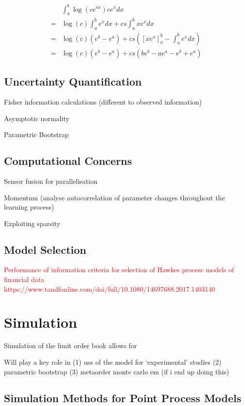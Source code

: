 \documentclass[honours,12pt]{unswthesis}
\numberwithin{equation}{section}
\begin{document}
\begin{equation*}
	\begin{align}
		& \int_a^b \log(c e^{sx}) c e^x dx \\
		= & \log(c) \int_a^b e^x dx + cs\int_a^b x e^x dx \\
		= & \log(c)(e^b-e^a) + cs \left(\left[x e^x\right]_a^b - \int_a^b e^x dx\right) \\
		= & \log(c)(e^b-e^a) + cs \left(be^b - a e^a - e^b + e^a\right)
	\end{align}
\end{equation*}


\section{Uncertainty Quantification}
Fisher information calculations (different to observed information)

Asymptotic normality

Parametric Bootstrap

\section{Computational Concerns}
Sensor fusion for parallelisation

Momentum (analyse autocorrelation of parameter changes throughout the learning process)

Exploiting sparsity \cite{NickelLe}

\section{Model Selection}

\textcolor{red}{Performance of information criteria for selection of Hawkes process models of financial data https://www.tandfonline.com/doi/full/10.1080/14697688.2017.1403140}

\chapter{Simulation}
Simulation of the limit order book allows for 

Will play a key role in (1) use of the model for `experimental' studies (2) parametric bootstrap (3) metaorder monte carlo em (if i end up doing this)

\section{Simulation Methods for Point Process Models}
\end{document}
